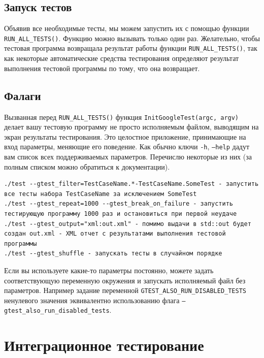 \documentclass[12pt, twoside]{report}
\begin{document}
\subsection*{Запуск тестов}

Объявив все необходимые тесты, мы можем запустить их с помощью функции \texttt{RUN\_ALL\_TESTS()}. Функцию можно вызывать только один раз. Желательно, чтобы тестовая программа возвращала 
результат работы функции \texttt{RUN\_ALL\_TESTS()}, так как некоторые автоматические средства тестирования определяют результат выполнения тестовой программы по тому, что она возвращает.

\subsection*{Фалаги}


Вызванная перед \texttt{RUN\_ALL\_TESTS()} функция \texttt{InitGoogleTest(argc, argv)} делает вашу тестовую программу не просто исполняемым файлом, выводящим на экран результаты тестирования. 
Это целостное приложение, принимающие на вход параметры, меняющие его поведение. Как обычно ключи \texttt{-h}, \texttt{--help} дадут вам список всех поддерживаемых параметров. Перечислю некоторые 
из них (за полным списком можно обратиться к документации).
\begin{verbatim}
./test --gtest_filter=TestCaseName.*-TestCaseName.SomeTest - запустить все тесты набора TestCaseName за исключением SomeTest
./test --gtest_repeat=1000 --gtest_break_on_failure - запустить тестирующую программу 1000 раз и остановиться при первой неудаче
./test --gtest_output="xml:out.xml" - помимо выдачи в std::out будет создан out.xml - XML отчет с результатами выполнения тестовой программы
./test --gtest_shuffle - запускать тесты в случайном порядке
\end{verbatim}

Если вы используете какие-то параметры постоянно, можете задать соответствующую переменную окружения и запускать исполняемый файл без параметров. 
Например задание переменной \texttt{GTEST\_ALSO\_RUN\_DISABLED\_TESTS} ненулевого значения эквивалентно использованию флага \texttt{--gtest\_also\_run\_disabled\_tests}.

\section*{Интеграционное тестирование}
\end{document}
